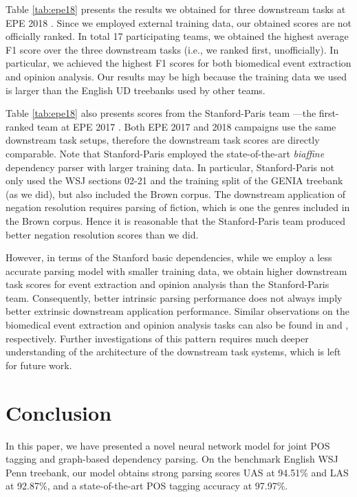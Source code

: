 \documentclass[11pt,letterpaper]{article}
\begin{document}
Table \ref{tab:epe18} presents the  results  we  obtained for three downstream tasks at EPE 2018 \citep{epe18}. Since we employed external training data, our obtained scores are not officially  ranked.  In total 17 participating teams, we obtained the highest average F1 score  over the three downstream tasks (i.e., we ranked first, unofficially).  
In particular, we achieved the highest F1 scores for both biomedical event extraction and opinion analysis. 
 Our  results may be high because the training data we used is larger than the English UD treebanks used by other  teams.


Table \ref{tab:epe18} also presents scores from the Stanford-Paris team \cite{stanfordparis2017}---the first-ranked team at  EPE 2017  \citep{epe17}. 
Both EPE 2017 and 2018 campaigns use the same downstream task setups,  therefore the downstream task scores are directly comparable. 
Note that Stanford-Paris employed the state-of-the-art \textit{biaffine} dependency parser \cite{dozat-qi-manning:2017:K17-3} with larger training data. In particular, Stanford-Paris not only used the WSJ sections 02-21 and the training split of the GENIA treebank (as we did), but also included the Brown corpus. The downstream application of negation resolution  requires parsing of fiction, which is one the genres included in the Brown corpus. Hence it is reasonable that the Stanford-Paris team produced better negation resolution scores than we did. 

However, in terms of the Stanford basic dependencies, while we employ a less  accurate parsing model with smaller training data, we obtain higher downstream task scores for event extraction and opinion analysis than the Stanford-Paris team. Consequently, better intrinsic parsing performance does not always imply better extrinsic downstream application performance. Similar observations on the biomedical event extraction and opinion analysis tasks can also be found in \citet{NguyenV2018} and \citet{GomezRodriguez2017}, respectively. 
Further investigations of this pattern requires much deeper understanding of the architecture of the downstream task systems, which is left for future work.


\section{Conclusion}

In this paper, we have presented a novel neural network model for joint
POS tagging and graph-based dependency parsing. On the benchmark English WSJ Penn treebank, our model obtains strong parsing scores UAS at 94.51\% and LAS at 92.87\%, and a state-of-the-art POS tagging accuracy at 97.97\%. 
\end{document}
